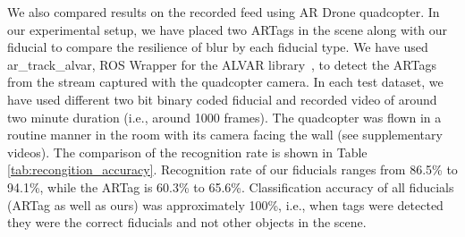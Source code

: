 \documentclass[runningheads]{llncs}
\begin{document}
We also compared results on the recorded feed using AR Drone quadcopter. In our
experimental setup, we have placed two ARTags in the scene along with our fiducial  to
compare the resilience of blur by each fiducial type. We have used
ar\_track\_alvar, ROS Wrapper for the ALVAR library~\cite{ros_alvar}, to detect
the ARTags from the stream captured with the quadcopter camera. In each test
dataset, we have used different two bit binary coded fiducial and recorded
video of around two minute duration (i.e., around 1000 frames).   The
quadcopter was flown in a routine manner in the room with its camera facing the
wall (see supplementary videos). The comparison of the recognition rate is
shown in Table \ref{tab:recongition_accuracy}. Recognition rate of our
fiducials ranges from 86.5\% to 94.1\%, while the ARTag is 60.3\% to 65.6\%.
Classification accuracy of all fiducials (ARTag as well as ours) was
approximately 100\%, i.e., when tags were detected they were the correct
fiducials and not other objects in the scene.
\end{document}
